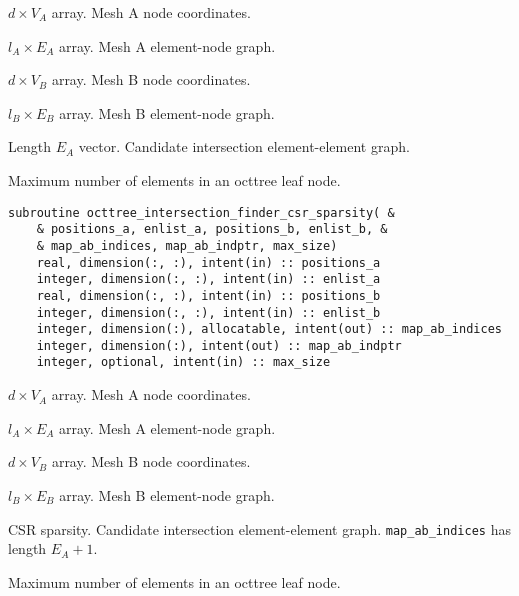 \documentclass{article}
\begin{document}
\begin{description}[font=\ttfamily\bfseries,leftmargin=2.2\parindent,labelindent=1.7\parindent,noitemsep]
  \item[positions\_a] $d \times V_A$ array. Mesh A node coordinates.
  \item[enlist\_a] $l_A \times E_A$ array. Mesh A element-node graph.
  \item[positions\_b] $d \times V_B$ array. Mesh B node coordinates.
  \item[enlist\_b] $l_B \times E_B$ array. Mesh B element-node graph.
  \item[map\_ab] Length $E_A$ vector. Candidate intersection element-element
    graph.
  \item[max\_size] Maximum number of elements in an octtree leaf node.
\end{description}
  
\begin{lstlisting}[language=FORTRAN]
  subroutine octtree_intersection_finder_csr_sparsity( &
    & positions_a, enlist_a, positions_b, enlist_b, &
    & map_ab_indices, map_ab_indptr, max_size)
    real, dimension(:, :), intent(in) :: positions_a
    integer, dimension(:, :), intent(in) :: enlist_a
    real, dimension(:, :), intent(in) :: positions_b
    integer, dimension(:, :), intent(in) :: enlist_b
    integer, dimension(:), allocatable, intent(out) :: map_ab_indices
    integer, dimension(:), intent(out) :: map_ab_indptr
    integer, optional, intent(in) :: max_size
\end{lstlisting}

\begin{description}[font=\ttfamily\bfseries,leftmargin=2.2\parindent,labelindent=1.7\parindent,noitemsep]
  \item[positions\_a] $d \times V_A$ array. Mesh A node coordinates.
  \item[enlist\_a] $l_A \times E_A$ array. Mesh A element-node graph.
  \item[positions\_b] $d \times V_B$ array. Mesh B node coordinates.
  \item[enlist\_b] $l_B \times E_B$ array. Mesh B element-node graph.
  \item[map\_ab\_indices, map\_ab\_indptr] CSR sparsity. Candidate intersection
    element-element graph. \linebreak \verb+map_ab_indices+ has length
    $E_A + 1$.
  \item[max\_size] Maximum number of elements in an octtree leaf node.
\end{description}
\end{document}
